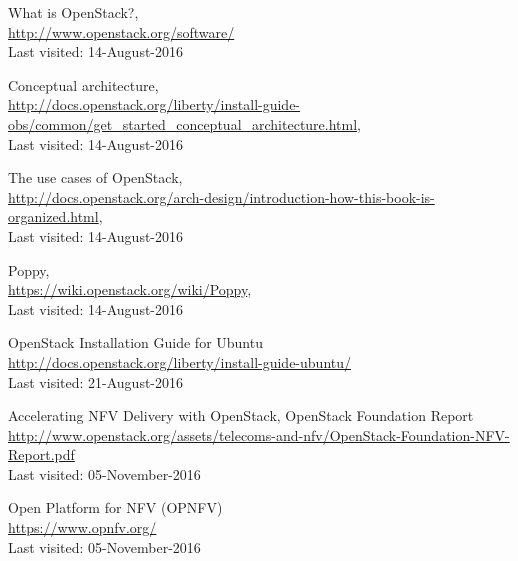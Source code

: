 \begin{thebibliography}{10}


What is OpenStack?,
\\\url{http://www.openstack.org/software/}
\\Last visited: 14-August-2016

Conceptual architecture,
\\\url{http://docs.openstack.org/liberty/install-guide-obs/common/get_started_conceptual_architecture.html},
\\Last visited: 14-August-2016

The use cases of OpenStack,
\\\url{http://docs.openstack.org/arch-design/introduction-how-this-book-is-organized.html},
\\Last visited: 14-August-2016

Poppy,
\\\url{https://wiki.openstack.org/wiki/Poppy},
\\Last visited: 14-August-2016

OpenStack Installation Guide for Ubuntu
\\\url{http://docs.openstack.org/liberty/install-guide-ubuntu/}
\\Last visited: 21-August-2016

Accelerating NFV Delivery with OpenStack, OpenStack Foundation Report
\\\url{http://www.openstack.org/assets/telecoms-and-nfv/OpenStack-Foundation-NFV-Report.pdf}
\\Last visited: 05-November-2016

Open Platform for NFV (OPNFV)
\\\url{https://www.opnfv.org/}
\\Last visited: 05-November-2016


\end{thebibliography}
